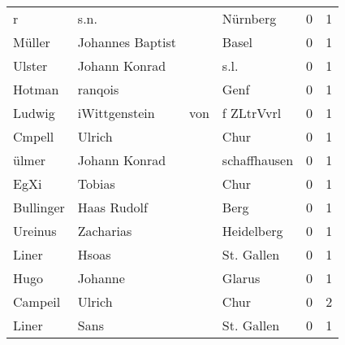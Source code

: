 \begin{center}
\begin{tiny}
\begin{longtabu}{llllrr}
                        r &                               s.n. &             &                                    Nürnberg &          0 &         1 \\
                   Müller &                   Johannes Baptist &             &                                       Basel &          0 &         1 \\
                   Ulster &                      Johann Konrad &             &                                        s.l. &          0 &         1 \\
                   Hotman &                            ranqois &             &                                        Genf &          0 &         1 \\
                   Ludwig &                      iWittgenstein &         von &                                  f ZLtrVvrl &          0 &         1 \\
                   Cmpell &                             Ulrich &             &                                        Chur &          0 &         1 \\
                    ülmer &                      Johann Konrad &             &                                schaffhausen &          0 &         1 \\
                     EgXi &                             Tobias &             &                                        Chur &          0 &         1 \\
                Bullinger &                        Haas Rudolf &             &                                        Berg &          0 &         1 \\
                  Ureinus &                          Zacharias &             &                                  Heidelberg &          0 &         1 \\
                    Liner &                              Hsoas &             &                                  St. Gallen &          0 &         1 \\
                     Hugo &                            Johanne &             &                                      Glarus &          0 &         1 \\
                  Campeil &                             Ulrich &             &                                        Chur &          0 &         2 \\
                    Liner &                               Sans &             &                                  St. Gallen &          0 &         1 \\

\end{longtabu}
\end{tiny}
\end{center}
